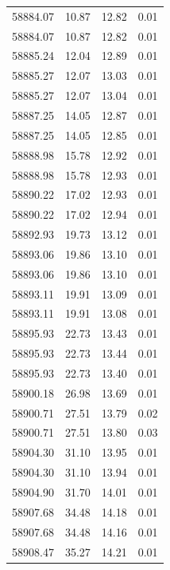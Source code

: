 \begin{longtable}{|c|c|c|c|}
 58884.07 &   10.87 &       12.82 &          0.01 \\
 58884.07 &   10.87 &       12.82 &          0.01 \\
 58885.24 &   12.04 &       12.89 &          0.01 \\
 58885.27 &   12.07 &       13.03 &          0.01 \\
 58885.27 &   12.07 &       13.04 &          0.01 \\
 58887.25 &   14.05 &       12.87 &          0.01 \\
 58887.25 &   14.05 &       12.85 &          0.01 \\
 58888.98 &   15.78 &       12.92 &          0.01 \\
 58888.98 &   15.78 &       12.93 &          0.01 \\
 58890.22 &   17.02 &       12.93 &          0.01 \\
 58890.22 &   17.02 &       12.94 &          0.01 \\
 58892.93 &   19.73 &       13.12 &          0.01 \\
 58893.06 &   19.86 &       13.10 &          0.01 \\
 58893.06 &   19.86 &       13.10 &          0.01 \\
 58893.11 &   19.91 &       13.09 &          0.01 \\
 58893.11 &   19.91 &       13.08 &          0.01 \\
 58895.93 &   22.73 &       13.43 &          0.01 \\
 58895.93 &   22.73 &       13.44 &          0.01 \\
 58895.93 &   22.73 &       13.40 &          0.01 \\
 58900.18 &   26.98 &       13.69 &          0.01 \\
 58900.71 &   27.51 &       13.79 &          0.02 \\
 58900.71 &   27.51 &       13.80 &          0.03 \\
 58904.30 &   31.10 &       13.95 &          0.01 \\
 58904.30 &   31.10 &       13.94 &          0.01 \\
 58904.90 &   31.70 &       14.01 &          0.01 \\
 58907.68 &   34.48 &       14.18 &          0.01 \\
 58907.68 &   34.48 &       14.16 &          0.01 \\
 58908.47 &   35.27 &       14.21 &          0.01 \\

\end{longtable}
